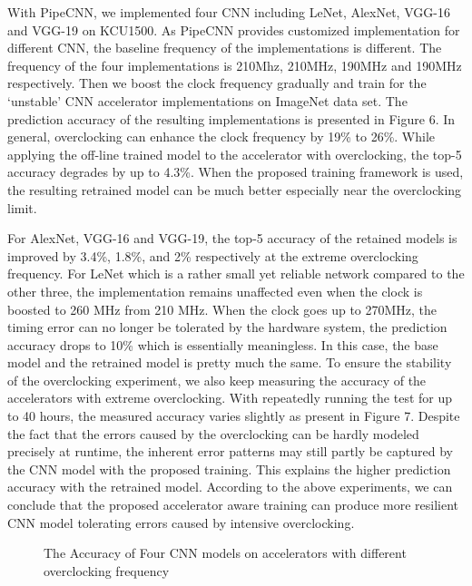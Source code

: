   With PipeCNN, we implemented four CNN including LeNet, AlexNet, VGG-16 and VGG-19 on KCU1500. 
As PipeCNN provides customized implementation for different CNN, the baseline frequency of the implementations 
is different. The frequency of the four implementations is 210Mhz, 210MHz, 190MHz and 190MHz respectively. 
Then we boost the clock frequency gradually and train for the ‘unstable’ CNN accelerator implementations on 
ImageNet data set.  The prediction accuracy of the resulting implementations is presented in Figure 6. In general, 
overclocking can enhance the clock frequency by 19\% to 26\%. While applying the off-line trained model 
to the accelerator with overclocking, the top-5 accuracy degrades by up to 4.3\%. When the proposed training 
framework is used, the resulting retrained model can be much better especially near the overclocking limit.

  For AlexNet, VGG-16 and VGG-19, the top-5 accuracy of the retained models is improved by 3.4\%, 1.8\%, and 2\% 
respectively at the extreme overclocking frequency. For LeNet which is a rather small yet reliable network 
compared to the other three, the implementation remains unaffected even when the clock is boosted to 260 MHz 
from 210 MHz. When the clock goes up to 270MHz, the timing error can no longer be tolerated by the hardware system, 
the prediction accuracy drops to 10\% which is essentially meaningless. In this case, the base model 
and the retrained model is pretty much the same. To ensure the stability of the overclocking experiment, 
we also keep measuring the accuracy of the accelerators with extreme overclocking. With repeatedly 
running the test for up to 40 hours, the measured accuracy varies slightly as present in Figure 7. 
Despite the fact that the errors caused by the overclocking can be hardly modeled precisely at runtime, 
the inherent error patterns may still partly be captured by the CNN model with the proposed training. 
This explains the higher prediction accuracy with the retrained model. According to the 
above experiments, we can conclude that the proposed accelerator aware training can produce 
more resilient CNN model tolerating errors caused by intensive overclocking. 

\begin{figure}
        \center
	\qquad
	\qquad
        \qquad
	\caption{The Accuracy of Four CNN models on accelerators with different overclocking frequency}
        \label{fig:overclock accuracy}
\end{figure}

